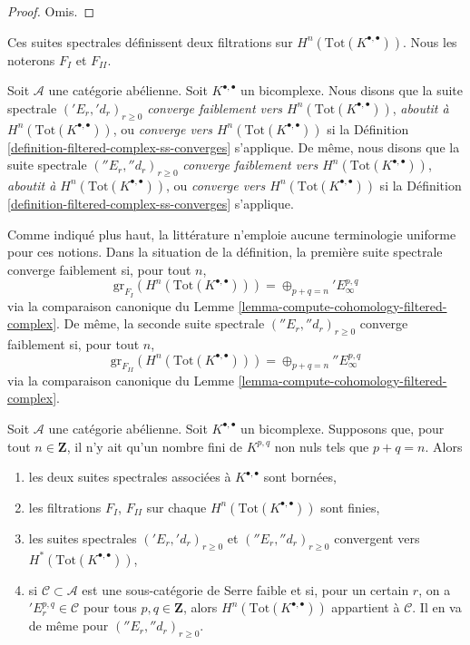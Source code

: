 \begin{proof}
Omis.
\end{proof}

\noindent
Ces suites spectrales définissent deux filtrations sur
$H^n(\text{Tot}(K^{\bullet, \bullet}))$.
Nous les noterons $F_I$ et $F_{II}$.

\begin{definition}
\label{definition-ss-double-complex-converge}
Soit $\mathcal{A}$ une catégorie abélienne.
Soit $K^{\bullet, \bullet}$ un bicomplexe.
Nous disons que la suite spectrale $({}'E_r, {}'d_r)_{r \geq 0}$
{\it converge faiblement vers $H^n(\text{Tot}(K^{\bullet, \bullet}))$},
{\it aboutit à $H^n(\text{Tot}(K^{\bullet, \bullet}))$}, ou
{\it converge vers $H^n(\text{Tot}(K^{\bullet, \bullet}))$}
si la Définition \ref{definition-filtered-complex-ss-converges} s'applique.
De même, nous disons que la suite spectrale $({}''E_r, {}''d_r)_{r \geq 0}$
{\it converge faiblement vers $H^n(\text{Tot}(K^{\bullet, \bullet}))$},
{\it aboutit à $H^n(\text{Tot}(K^{\bullet, \bullet}))$}, ou
{\it converge vers $H^n(\text{Tot}(K^{\bullet, \bullet}))$}
si la Définition \ref{definition-filtered-complex-ss-converges} s'applique.
\end{definition}

\noindent
Comme indiqué plus haut, la littérature n'emploie aucune terminologie
uniforme pour ces notions. Dans la situation de la définition, la première
suite spectrale converge faiblement si, pour tout $n$,
$$
\text{gr}_{F_I}(H^n(\text{Tot}(K^{\bullet, \bullet}))) =
\oplus_{p + q = n} {}'E_\infty^{p, q}
$$
via la comparaison canonique du
Lemme \ref{lemma-compute-cohomology-filtered-complex}.
De même, la seconde suite spectrale $({}''E_r, {}''d_r)_{r \geq 0}$
converge faiblement si, pour tout $n$,
$$
\text{gr}_{F_{II}}(H^n(\text{Tot}(K^{\bullet, \bullet}))) =
\oplus_{p + q = n} {}''E_\infty^{p, q}
$$
via la comparaison canonique du
Lemme \ref{lemma-compute-cohomology-filtered-complex}.

\begin{lemma}
\label{lemma-first-quadrant-ss}
Soit $\mathcal{A}$ une catégorie abélienne. Soit $K^{\bullet, \bullet}$
un bicomplexe. Supposons que, pour tout $n \in \mathbf{Z}$, il n'y ait
qu'un nombre fini de $K^{p, q}$ non nuls tels que $p + q = n$. Alors
\begin{enumerate}
\item les deux suites spectrales associées à $K^{\bullet, \bullet}$
sont bornées,
\item les filtrations $F_I$, $F_{II}$ sur chaque
$H^n(\text{Tot}(K^{\bullet, \bullet}))$ sont finies,
\item les suites spectrales $({}'E_r, {}'d_r)_{r \geq 0}$ et
$({}''E_r, {}''d_r)_{r \geq 0}$ convergent vers
$H^*(\text{Tot}(K^{\bullet, \bullet}))$,
\item si $\mathcal{C} \subset \mathcal{A}$ est une sous-catégorie de Serre faible
et si, pour un certain $r$, on a ${}'E_r^{p, q} \in \mathcal{C}$ pour tous
$p, q \in \mathbf{Z}$, alors $H^n(\text{Tot}(K^{\bullet, \bullet}))$
appartient à $\mathcal{C}$. Il en va de même pour $({}''E_r, {}''d_r)_{r \geq 0}$.
\end{enumerate}
\end{lemma}

